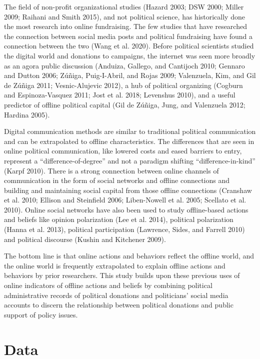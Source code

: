 \documentclass[12pt,]{article}
\begin{document}
The field of non-profit organizational studies (Hazard 2003; DSW 2000;
Miller 2009; Raihani and Smith 2015), and not political science, has
historically done the most research into online fundraising. The few
studies that have researched the connection between social media posts
and political fundraising have found a connection between the two (Wang
et al. 2020). Before political scientists studied the digital world and
donations to campaigns, the internet was seen more broadly as an agora
public discussion (Anduiza, Gallego, and Cantijoch 2010; Gennaro and
Dutton 2006; Zúñiga, Puig-I-Abril, and Rojas 2009; Valenzuela, Kim, and
Gil de Zúñiga 2011; Vesnic-Alujevic 2012), a hub of political organizing
(Cogburn and Espinoza-Vasquez 2011; Jost et al. 2018; Levenshus 2010),
and a useful predictor of offline political capital (Gil de Zúñiga,
Jung, and Valenzuela 2012; Hardina 2005).

Digital communication methods are similar to traditional political
communication and can be extrapolated to offline characteristics. The
differences that are seen in online political communication, like
lowered costs and eased barriers to entry, represent a
``difference-of-degree'' and not a paradigm shifting
``difference-in-kind'' (Karpf 2010). There is a strong connection
between online channels of communication in the form of social networks
and offline connections and building and maintaining social capital from
those offline connections (Cranshaw et al. 2010; Ellison and Steinfield
2006; Liben-Nowell et al. 2005; Scellato et al. 2010). Online social
networks have also been used to study offline-based actions and beliefs
like opinion polarization (Lee et al. 2014), political polarization
(Hanna et al. 2013), political participation (Lawrence, Sides, and
Farrell 2010) and political discourse (Kushin and Kitchener 2009).

The bottom line is that online actions and behaviors reflect the offline
world, and the online world is frequently extrapolated to explain
offline actions and behaviors by prior researchers. This study builds
upon these previous uses of online indicators of offline actions and
beliefs by combining political administrative records of political
donations and politicians' social media accounts to discern the
relationship between political donations and public support of policy
issues.

\hypertarget{data}{%
\section{Data}\label{data}}
\end{document}
